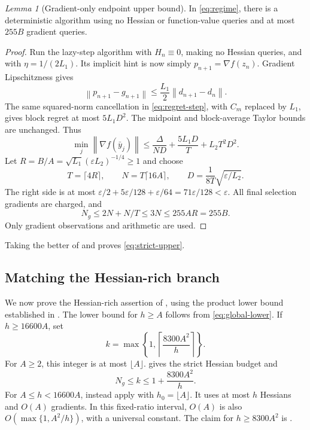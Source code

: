 \documentclass[11pt]{article}
\newtheorem{lemma}[theorem]{Lemma}
\theoremstyle{remark}
\newtheorem{lemma}[lemma]{Lemma}
\theoremstyle{remark}
\newcommand{\eps}{\varepsilon}
\newcommand{\norm}[1]{\left\lVert#1\right\rVert}
\begin{document}
\begin{lemma}[Gradient-only endpoint upper bound]\label{lem:gradient-only}
In \eqref{eq:regime}, there is a deterministic algorithm using no Hessian or function-value queries and at most $255B$ gradient queries.
\end{lemma}
\begin{proof}
Run the lazy-step algorithm with $H_n\equiv0$, making no Hessian queries, and with $\eta=1/(2L_1)$. Its implicit hint is now simply $p_{n+1}=\nabla f(z_n)$. Gradient Lipschitzness gives
\[
 \norm{p_{n+1}-g_{n+1}}
 \le \frac{L_1}{2}\norm{d_{n+1}-d_n}.
\]
The same squared-norm cancellation in \eqref{eq:regret-step}, with $C_m$ replaced by $L_1$, gives block regret at most $5L_1D^2$. The midpoint and block-average Taylor bounds are unchanged. Thus
\[
 \min_j\norm{\nabla f(\bar y_j)}
 \le\frac{\Delta}{ND}+\frac{5L_1D}{T}+L_2T^2D^2.
\]
Let $R=B/A=\sqrt{L_1}(\eps L_2)^{-1/4}\ge1$ and choose
\[
 T=\lceil4R\rceil,\qquad N=T\lceil16A\rceil,
 \qquad D=\frac1{8T}\sqrt{\eps/L_2}.
\]
The right side is at most
$\eps/2+5\eps/128+\eps/64=71\eps/128<\eps$.
All final selection gradients are charged, and
\[
 N_g\le2N+N/T\le3N\le255AR=255B.
\]
Only gradient observations and arithmetic are used.
\end{proof}

Taking the better of  and  proves \eqref{eq:strict-upper}.

\subsection{Matching the Hessian-rich branch}\label{sec:rich-match}
We now prove the Hessian-rich assertion of , using the product lower bound established in . The lower bound for $h\ge A$ follows from \eqref{eq:global-lower}. If $h\ge16600A$, set
\[
 k=\max\left\{1,\left\lceil\frac{8300A^2}{h}\right\rceil\right\}.
\]
For $A\ge2$, this integer is at most $\lfloor A\rfloor$.  gives the strict Hessian budget and
\[
 N_g\le k\le1+\frac{8300A^2}{h}.
\]
For $A\le h<16600A$, instead apply  with $h_0=\lfloor A\rfloor$. It uses at most $h$ Hessians and $O(A)$ gradients. In this fixed-ratio interval, $O(A)$ is also $O(\max\{1,A^2/h\})$, with a universal constant. The claim for $h\ge8300A^2$ is .
\end{document}
